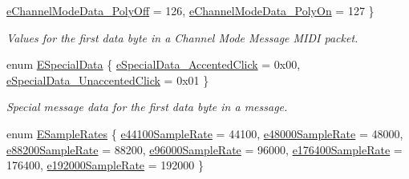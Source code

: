 \begin{DoxyCompactItemize}
\mbox{\hyperlink{a00852_a51c6649733dc2e7ce2364c7b52ddf461ac2819c2b9eeec76609fa42609b2fd878}{e\+Channel\+Mode\+Data\+\_\+\+Poly\+Off}} = 126, 
\mbox{\hyperlink{a00852_a51c6649733dc2e7ce2364c7b52ddf461ada14fa008d32a84173ed0f0e9d416a49}{e\+Channel\+Mode\+Data\+\_\+\+Poly\+On}} = 127
 \}
\begin{DoxyCompactList}\small\item\em Values for the first data byte in a Channel Mode Message M\+I\+DI packet. \end{DoxyCompactList}\item 
enum \mbox{\hyperlink{a00852_a6884ba464f3e76eb758d45daf1395199}{E\+Special\+Data}} \{ \mbox{\hyperlink{a00852_a6884ba464f3e76eb758d45daf1395199a52061b5587075953631c1389016cb0cf}{e\+Special\+Data\+\_\+\+Accented\+Click}} = 0x00, 
\mbox{\hyperlink{a00852_a6884ba464f3e76eb758d45daf1395199a35a276fca410721fc1c39adb01be7af3}{e\+Special\+Data\+\_\+\+Unaccented\+Click}} = 0x01
 \}
\begin{DoxyCompactList}\small\item\em Special message data for the first data byte in a message. \end{DoxyCompactList}\item 
enum \mbox{\hyperlink{a00852_a60daf5874c02a01d2af8c582c0643e2d}{E\+Sample\+Rates}} \{ \newline
\mbox{\hyperlink{a00852_a60daf5874c02a01d2af8c582c0643e2da0fabb364c77d1597745ea7faede310a9}{e44100\+Sample\+Rate}} = 44100, 
\mbox{\hyperlink{a00852_a60daf5874c02a01d2af8c582c0643e2dabf618a3399a754a6ec3a367c102f8850}{e48000\+Sample\+Rate}} = 48000, 
\mbox{\hyperlink{a00852_a60daf5874c02a01d2af8c582c0643e2da6b2f92d94b3c151993d544d924321620}{e88200\+Sample\+Rate}} = 88200, 
\mbox{\hyperlink{a00852_a60daf5874c02a01d2af8c582c0643e2da1161e560e2b301b8b45d17083696915e}{e96000\+Sample\+Rate}} = 96000, 
\newline
\mbox{\hyperlink{a00852_a60daf5874c02a01d2af8c582c0643e2da17be0028e4f2ca09f095573240cef263}{e176400\+Sample\+Rate}} = 176400, 
\mbox{\hyperlink{a00852_a60daf5874c02a01d2af8c582c0643e2da755a96e92d23adf2ad3546551e2ad49c}{e192000\+Sample\+Rate}} = 192000
 \}
\end{DoxyCompactItemize}
